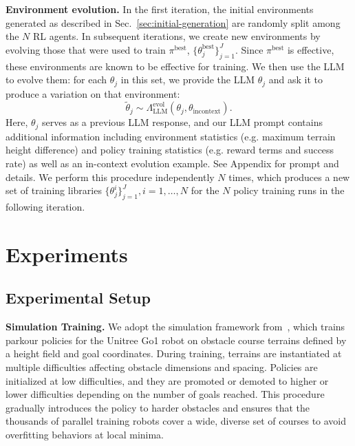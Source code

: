 \documentclass{article}
\begin{document}
\textbf{Environment evolution.}
In the first iteration, the initial environments generated as described in Sec.~\ref{sec:initial-generation} are randomly split among the $N$ RL agents. In subsequent iterations, we create new environments by evolving those that were used to train $\pi^{\text{best}}$, $\{\theta_j^{\text{best}}\}_{j=1}^J$. Since $\pi^{\text{best}}$ is effective, these environments are known to be effective for training. We then use the LLM to evolve them: for each $\theta_j$ in this set, we provide the LLM $\theta_j$ and ask it to produce a variation on that environment:
\begin{equation}
\label{eq:llm-mutation}
\tilde\theta_j \sim \Lambda_{\text{LLM}}^{\text{evol}}\left(\theta_j,\theta_{\text{incontext}}\right).
\end{equation}
Here, $\theta_j$ serves as a previous LLM response, and our LLM prompt contains additional information including environment statistics (e.g. maximum terrain height difference) and policy training statistics (e.g. reward terms and success rate) as well as an in-context evolution example. See Appendix for prompt and details. We perform this procedure independently $N$ times, which produces a new set of training libraries $\{\theta^i_j\}_{j=1}^J, i = 1, \ldots, N$ for the $N$ policy training runs in the following iteration.


\section{Experiments}
\label{sec:results}

\subsection{Experimental Setup}
\label{sec:experimental-setup}
\textbf{Simulation Training.} We adopt the simulation framework from~\citet{cheng2023extreme}, which trains parkour policies for the Unitree Go1 robot on obstacle course terrains defined by a height field and goal coordinates. During training, terrains are instantiated at multiple difficulties affecting obstacle dimensions and spacing. Policies are initialized at low difficulties, and they are promoted or demoted to higher or lower difficulties depending on the number of goals reached. This procedure gradually introduces the policy to harder obstacles and ensures that the thousands of parallel training robots cover a wide, diverse set of courses to avoid overfitting behaviors at local minima.
\end{document}
